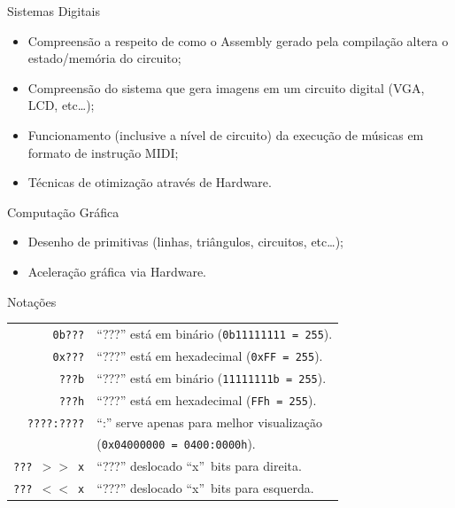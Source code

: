 \documentclass{beamer}
\begin{document}
\begin{darkframes}
    \begin{frame}{Sistemas Digitais}
        \begin{itemize}
            \item Compreensão a respeito de como o Assembly gerado pela
                compilação altera o estado/memória do circuito;
            \item Compreensão do sistema que gera imagens em um circuito
                digital (VGA, LCD, etc\ldots);
            \item Funcionamento (inclusive a nível de circuito) da execução de
                músicas em formato de instrução MIDI\@;
            \item Técnicas de otimização através de Hardware.
        \end{itemize}
    \end{frame}

    \begin{frame}{Computação Gráfica}
        \begin{itemize}
            \item Desenho de primitivas (linhas, triângulos, circuitos, etc\ldots);
            \item Aceleração gráfica via Hardware.
        \end{itemize}
    \end{frame}

    \begin{frame}{Notações}
        \begin{center}
            \begin{tabular}{r|l}
                \texttt{0b???}      & \enquote{???} está em binário (\texttt{0b11111111 = 255}).\\
                \texttt{0x???}      & \enquote{???} está em hexadecimal (\texttt{0xFF = 255}).\\
                \texttt{???b}       & \enquote{???} está em binário (\texttt{11111111b = 255}).\\
                \texttt{???h}       & \enquote{???} está em hexadecimal (\texttt{FFh = 255}).\\
                \texttt{????:????}  & \enquote{:} serve apenas para melhor visualização \\
                                    & (\texttt{0x04000000 = 0400:0000h}).\\
                \texttt{??? $>>$ x} & \enquote{???} deslocado ``x''\ bits para direita.\\
                \texttt{??? $<<$ x} & \enquote{???} deslocado ``x''\ bits para esquerda.\\
            \end{tabular}
        \end{center}
    \end{frame}



\end{darkframes}
\end{document}
